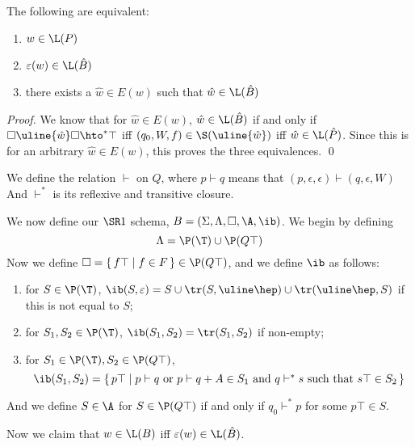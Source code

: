 \documentclass{llncs}
\begin{document}
\begin{theorem}

    The following are equivalent:
    \begin{enumerate}
        \item $w\in\L(P)$
        \item $\epsilon(w)\in\L(\hat B)$
        \item there exists a $\hat w\in E(w)$ such that $\hat w\in\L(\hat B)$
    \end{enumerate}

\end{theorem}

\begin{proof}

    We know that for $\hat w\in E(w)$, $\hat w\in\L(\hat B)$ if and only if $\square\uline{\hat w}\square\hto^*\top$ iff $(q_0,W,f)\in\S(\uline{\hat w})$ iff $\hat w\in\L(\hat P)$.
    Since this is for an arbitrary $\hat w\in E(w)$, this proves the three equivalences.
    \qed

\end{proof}


We define the relation $\vdash$ on $Q$, where $p\vdash q$ means that $(p,\epsilon,\epsilon)\vdash(q,\epsilon,W)$
And $\vdash^*$ is its reflexive and transitive closure.

We now define our $\SR1$ schema, $B=(\Sigma,\Lambda,\square,\A,\ib)$.
We begin by defining
$$ \Lambda = \P(\T) \cup \P(Q\top) $$
Now we define $\square=\set{f\top}[f\in F]\in\P(Q\top)$, and we define $\ib$ as follows:
\begin{enumerate}
    \item for $S\in\P(\T)$, $\ib(S,\epsilon)=S\cup\tr(S,\uline\hep)\cup\tr(\uline\hep,S)$ if this is not equal to $S$;
    \item for $S_1,S_2\in\P(\T)$, $\ib(S_1,S_2)=\tr(S_1,S_2)$ if non-empty;
    \item for $S_1\in\P(\T),S_2\in\P(Q\top)$,
    $$ \ib(S_1,S_2)=\set{p\top}[\hbox{$p\vdash q$ or $p\vdash q+A\in S_1$ and $q\vdash^*s$ such that $s\top\in S_2$}] $$
\end{enumerate}
And we define $S\in\A$ for $S\in\P(Q\top)$ if and only if $q_0\vdash^*p$ for some $p\top\in S$.

Now we claim that $w\in\L(B)$ iff $\epsilon(w)\in\L(\hat B)$.
\end{document}
